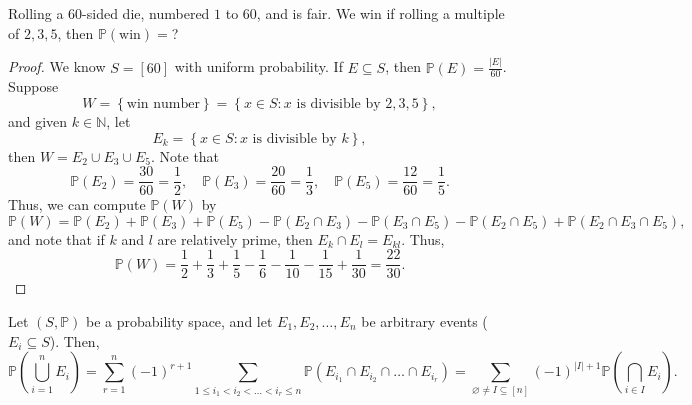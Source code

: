 \begin{eg}
    Rolling a \(60\)-sided die, numbered \(1\) to \(60\), and is fair. We win if rolling a multiple of \(2, 3, 5\), then \(\mathbb{P} (\text{win} )=\)?     
\end{eg}

\begin{proof}
    We know \(S=[60]\) with uniform probability. If \(E \subseteq S\), then \(\mathbb{P} (E) = \frac{\vert E \vert }{60}\). Suppose
    \[
        W = \left\{ \text{win number}  \right\} = \left\{ x \in S: x \text{ is divisible by } 2,3,5  \right\},  
    \]    
    and given \(k \in \mathbb{N} \), let 
    \[
        E_k = \left\{ x \in S: x \text{ is divisible by } k  \right\}, 
    \] 
    then \(W = E_2 \cup E_3 \cup E_5\). Note that 
    \[
        \mathbb{P} (E_2) = \frac{30}{60} = \frac{1}{2}, \quad \mathbb{P} (E_3) = \frac{20}{60} = \frac{1}{3}, \quad \mathbb{P} (E_5) = \frac{12}{60} = \frac{1}{5}.
    \] 
    Thus, we can compute \(\mathbb{P} (W)\) by 
    \[
        \mathbb{P} (W) = \mathbb{P} (E_2) + \mathbb{P} (E_3) + \mathbb{P} (E_5) - \mathbb{P} (E_2 \cap E_3) - \mathbb{P} (E_3 \cap E_5) - \mathbb{P} (E_2 \cap E_5) + \mathbb{P} (E_2 \cap E_3 \cap E_5),
    \] 
    and note that if \(k\) and \(l\) are relatively prime, then \(E_k \cap E_l = E_{kl}\). Thus,
    \[
        \mathbb{P} (W) = \frac{1}{2} + \frac{1}{3} + \frac{1}{5} - \frac{1}{6} - \frac{1}{10} - \frac{1}{15} + \frac{1}{30} = \frac{22}{30}.
    \]   
\end{proof}

\begin{theorem}
    Let \((S, \mathbb{P} )\) be a probability space, and let \(E_1, E_2, \dots , E_n\) be arbitrary events (\(E_i \subseteq S\)). Then, 
    \[
        \mathbb{P} \left( \bigcup_{i=1}^{n} E_i  \right) = \sum_{r=1}^n (-1)^{r+1} \sum_{1 \le i_1 < i_2 < \dots < i_r \le n} \mathbb{P} (E_{i_1} \cap E_{i_2} \cap \dots \cap E_{i_r}) = \sum_{\varnothing \neq I \subseteq [n]} (-1)^{\vert I \vert + 1 } \mathbb{P} \left( \bigcap_{i \in I} E_i  \right) .   
    \]  
\end{theorem}

